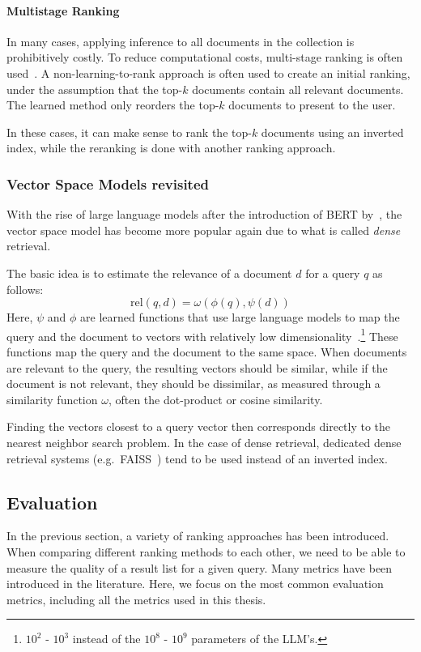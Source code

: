 \paragraph{Multistage Ranking}
\label{sec:multistage}
In many cases, applying inference to all documents in the collection is prohibitively costly. To reduce computational costs, multi-stage ranking is often used~\citep{multi-stage}.
A non-learning-to-rank approach is often used to create an initial ranking, under the assumption that the top-$k$ documents contain all relevant documents. The learned method only reorders the top-$k$ documents to present to the user. 

In these cases, it can make sense to rank the top-$k$ documents using an inverted index, while the reranking is done with another ranking approach.

\subsubsection{Vector Space Models revisited}
With the rise of large language models after the introduction of BERT by~\cite{BERT}, the vector space model has become more popular again due to what is called \emph{dense} retrieval.  

The basic idea is to estimate the relevance of a document $d$ for a query $q$ as follows:
\begin{equation}
	\text{rel}(q, d) = \omega\left(\phi\left(q\right),
	\psi\left(d\right)\right)
\end{equation}
Here, $\psi$ and $\phi$ are learned functions that use large language models to map the query and the document to vectors with relatively low dimensionality~\citep{seperation-logical-physical}.\footnote{$10^2$ - $10^3$ instead of the $10^8$ - $10^9$ parameters of the LLM's.} These functions map the query and the document to the same space. When documents are relevant to the query, the resulting vectors should be similar, while if the document is not relevant, they should be dissimilar, as measured through a similarity function $\omega$, often the dot-product or cosine similarity.

Finding the vectors closest to a query vector then corresponds directly to the nearest neighbor search problem. In the case of dense retrieval, dedicated dense retrieval systems (e.g.\ FAISS~\citep{faiss}) tend to be used instead of an inverted index. 

\subsection{Evaluation}
\label{sec:evaluation}
In the previous section, a variety of ranking approaches has been introduced. When comparing different ranking methods to each other, we need to be able to measure the quality of a result list for a given query. Many metrics have been introduced in the literature. Here, we focus on the most common evaluation metrics, including all the metrics used in this thesis. 


